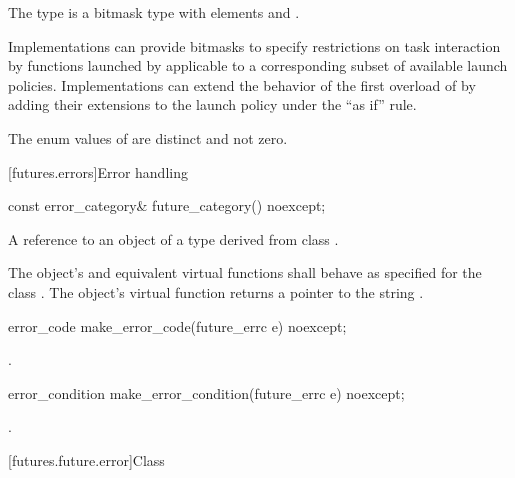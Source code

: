 \pnum
The  type  is a bitmask type with
elements  and .
\begin{note}
Implementations can provide bitmasks to specify restrictions on task
interaction by functions launched by  applicable to a
corresponding subset of available launch policies. Implementations can extend
the behavior of the first overload of  by adding their extensions
to the launch policy under the ``as if'' rule.
\end{note}

\pnum
The enum values of  are distinct and not zero.

[futures.errors]{Error handling}

%
\begin{itemdecl}
const error_category& future_category() noexcept;
\end{itemdecl}

\begin{itemdescr}
\pnum
\returns
A reference to an object of a type derived from class .

\pnum
The object's  and equivalent virtual functions shall
behave as specified for the class . The object's 
virtual function returns a pointer to the string .
\end{itemdescr}

%
\begin{itemdecl}
error_code make_error_code(future_errc e) noexcept;
\end{itemdecl}

\begin{itemdescr}
\pnum
\returns
{}.
\end{itemdescr}

%
\begin{itemdecl}
error_condition make_error_condition(future_errc e) noexcept;
\end{itemdecl}

\begin{itemdescr}
\pnum
\returns
{}.
\end{itemdescr}

[futures.future.error]{Class }

